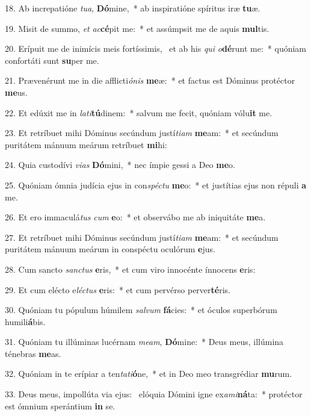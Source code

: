 18. Ab increpatióne \textit{tu}\textit{a}, \textbf{Dó}mine,~*  ab inspiratióne spíritus iræ \textbf{tu}æ.\

19. Misit de summo, \textit{et} \textit{ac}\textbf{cé}pit me:~*  et assúmpsit me de aquis \textbf{mul}tis.\

20. Erípuit me de inimícis meis fortíssimis, \dag\  et ab his \textit{qui} \textit{o}\textbf{dé}runt me:~*  quóniam confortáti sunt \textbf{su}per me.\

21. Prævenérunt me in die afflicti\textit{ó}\textit{nis} \textbf{me}æ:~*  et factus est Dóminus protéctor \textbf{me}us.\

22. Et edúxit me in \textit{la}\textit{ti}\textbf{tú}dinem:~*  salvum me fecit, quóniam vólu\textbf{it} me.\

23. Et retríbuet mihi Dóminus secúndum justí\textit{ti}\textit{am} \textbf{me}am:~*  et secúndum puritátem mánuum meárum retríbuet \textbf{mi}hi:\

24. Quia custodívi \textit{vi}\textit{as} \textbf{Dó}mini,~*  nec ímpie gessi a Deo \textbf{me}o.\

25. Quóniam ómnia judícia ejus in con\textit{spéc}\textit{tu} \textbf{me}o:~*  et justítias ejus non répuli \textbf{a} me.\

26. Et ero immaculá\textit{tus} \textit{cum} \textbf{e}o:~*  et observábo me ab iniquitáte \textbf{me}a.\

27. Et retríbuet mihi Dóminus secúndum justí\textit{ti}\textit{am} \textbf{me}am:~*  et secúndum puritátem mánuum meárum in conspéctu oculórum \textbf{e}jus.\

28. Cum sancto \textit{sanc}\textit{tus} \textbf{e}ris,~*  et cum viro innocénte ínnocens \textbf{e}ris:\

29. Et cum elécto e\textit{léc}\textit{tus} \textbf{e}ris:~*  et cum pervérso perver\textbf{té}ris.\

30. Quóniam tu pópulum húmilem \textit{sal}\textit{vum} \textbf{fá}cies:~*  et óculos superbórum humili\textbf{á}bis.\

31. Quóniam tu illúminas lucérnam \textit{me}\textit{am}, \textbf{Dó}mine:~*  Deus meus, illúmina ténebras \textbf{me}as.\

32. Quóniam in te erípiar a ten\textit{ta}\textit{ti}\textbf{ó}ne,~*  et in Deo meo transgrédiar \textbf{mu}rum.\

33. Deus meus, impollúta via ejus: \dag\  elóquia Dómini igne ex\textit{a}\textit{mi}\textbf{ná}ta:~*  protéctor est ómnium sperántium \textbf{in} se.\


